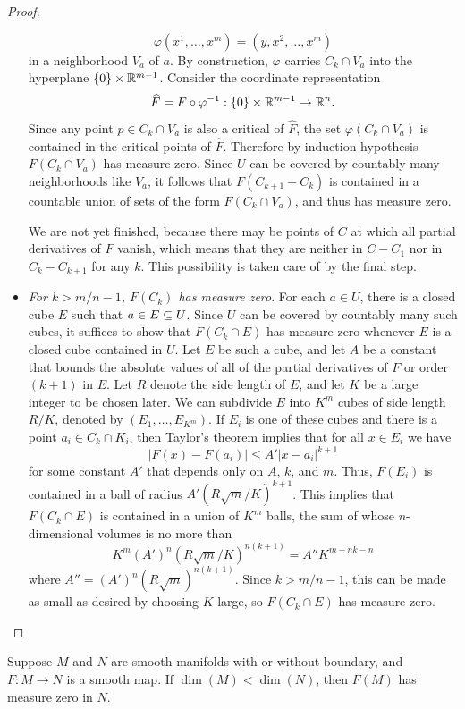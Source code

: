 \begin{proof}
\begin{itemize}
\[\varphi(x^1,\dots,x^m)=(y,x^2,\dots,x^m)\]
in a neighborhood $V_a$ of $a$. By construction, $\varphi$ carries $C_k\cap V_a$ into the hyperplane $\{0\}\times\mathbb{R}^{m-1}$. Consider the coordinate representation \[\widehat{F}=F\circ\varphi^{-1}:\{0\}\times\mathbb{R}^{m-1}\to\mathbb{R}^n.\] Since any point $p\in C_k\cap V_a$ is also a critical of $\widehat{F}$, the set $\varphi(C_k\cap V_a)$ is contained in the critical points of $\widehat{F}$. Therefore by induction hypothesis $F(C_k\cap V_a)$ has measure zero. Since $U$ can be covered by countably many neighborhoods like $V_a$, it follows that $F(C_{k+1}-C_k)$ is contained in a countable union of sets of the form $F(C_k\cap V_a)$, and thus has measure zero.\par
We are not yet finished, because there may be points of $C$ at which all partial derivatives of $F$ vanish, which means that they are neither in $C-C_1$ nor in $C_k-C_{k+1}$ for any $k$. This possibility is taken care of by the final step.
\item  \textit{For $k>m/n-1$, $F(C_k)$ has measure zero}. For each $a\in U$, there is a closed cube $E$ such that $a\in E\subseteq U$. Since $U$ can be covered by countably many such cubes, it suffices to show that $F(C_k\cap E)$ has measure zero whenever $E$ is a closed cube contained in $U$. Let $E$ be such a cube, and let $A$ be a constant that bounds the absolute values of all of the partial derivatives of $F$ or order $(k+1)$ in $E$. Let $R$
denote the side length of $E$, and let $K$ be a large integer to be chosen later. We can subdivide $E$ into $K^m$ cubes of side length $R/K$, denoted by $(E_1,\dots,E_{K^m})$. If $E_i$ is one of these cubes and there is a point $a_i\in C_k\cap K_i$, then Taylor's theorem implies that for all $x\in E_i$ we have
\[|F(x)-F(a_i)|\leq A'|x-a_i|^{k+1}\]
for some constant $A'$ that depends only on $A$, $k$, and $m$. Thus, $F(E_i)$ is contained in a ball of radius $A'(R\sqrt{m}/K)^{k+1}$. This implies that $F(C_k\cap E)$ is contained in a union of $K^m$ balls, the sum of whose $n$-dimensional volumes is no more than
\[K^m(A')^n(R\sqrt{m}/K)^{n(k+1)}=A''K^{m-nk-n}\]
where $A''=(A')^n(R\sqrt{m})^{n(k+1)}$. Since $k>m/n-1$, this can be made as small as desired by choosing $K$ large, so $F(C_k\cap E)$ has measure zero.
\end{itemize}
\end{proof}
\begin{corollary}\label{smooth image measure zero}
Suppose $M$ and $N$ are smooth manifolds with or without boundary, and $F:M\to N$ is a smooth map. If $\dim(M)<\dim(N)$, then $F(M)$ has measure zero in $N$.
\end{corollary}
